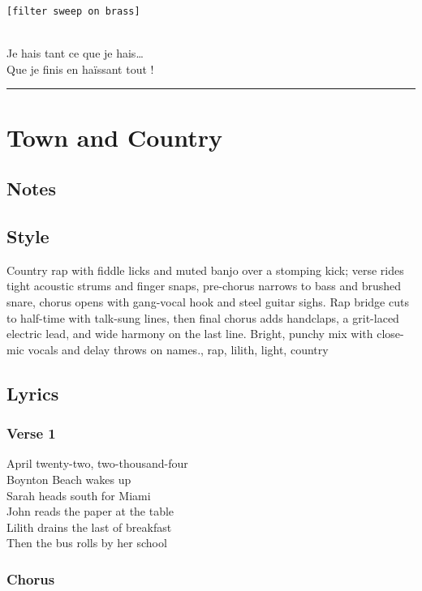 \documentclass[]{article}
\begin{document}
\texttt{{[}filter\ sweep\ on\ brass{]}}\strut \\
Je hais tant ce que je hais\ldots{}\\
Que je finis en haïssant tout !

\begin{center}\rule{0.5\linewidth}{0.5pt}\end{center}

\section{Town and Country}\label{town-and-country}

\subsection{Notes}\label{notes-20}

\subsection{Style}\label{style-20}

Country rap with fiddle licks and muted banjo over a stomping kick;
verse rides tight acoustic strums and finger snaps, pre-chorus narrows
to bass and brushed snare, chorus opens with gang-vocal hook and steel
guitar sighs. Rap bridge cuts to half-time with talk-sung lines, then
final chorus adds handclaps, a grit-laced electric lead, and wide
harmony on the last line. Bright, punchy mix with close-mic vocals and
delay throws on names., rap, lilith, light, country

\subsection{Lyrics}\label{lyrics-20}

\subsubsection{Verse 1}\label{verse-1-12}

April twenty-two, two-thousand-four\\
Boynton Beach wakes up\\
Sarah heads south for Miami\\
John reads the paper at the table\\
Lilith drains the last of breakfast\\
Then the bus rolls by her school

\subsubsection{Chorus}\label{chorus-31}
\end{document}
